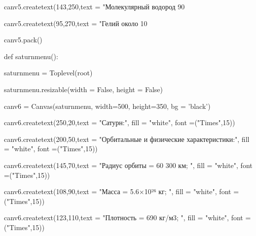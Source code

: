 \documentclass[14pt, oneside]{SavkinSeliverstov}
\begin{document}
	canv\underline{\hspace{0.2cm}}5.create\underline{\hspace{0.2cm}}text(143,250,text = "Молекулярный водород 90%

	canv\underline{\hspace{0.2cm}}5.create\underline{\hspace{0.2cm}}text(95,270,text = "Гелий около 10%
	
	canv\underline{\hspace{0.2cm}}5.pack()

def saturn\underline{\hspace{0.2cm}}menu():
	
	saturn\underline{\hspace{0.2cm}}menu = Toplevel(root)
	
	saturn\underline{\hspace{0.2cm}}menu.resizable(width = False, height = False)
	
	canv\underline{\hspace{0.2cm}}6 = Canvas(saturn\underline{\hspace{0.2cm}}menu, width=500, height=350, bg = 'black')
	
	canv\underline{\hspace{0.2cm}}6.create\underline{\hspace{0.2cm}}text(250,20,text = "Сатурн:", fill = "white", font =("Times",15))
	
	canv\underline{\hspace{0.2cm}}6.create\underline{\hspace{0.2cm}}text(200,50,text = "Орбитальные и физические характеристики:", fill = "white", font =("Times",15))

	canv\underline{\hspace{0.2cm}}6.create\underline{\hspace{0.2cm}}text(145,70,text = "Радиус орбиты =  60 300 км; ", fill = "white", font =("Times",15))

	canv\underline{\hspace{0.2cm}}6.create\underline{\hspace{0.2cm}}text(108,90,text = "Масса = 5.6×10²⁶ кг; ", fill = "white", font =("Times",15))

	canv\underline{\hspace{0.2cm}}6.create\underline{\hspace{0.2cm}}text(123,110,text = "Плотность = 690 кг/м3; ", fill = "white", font =("Times",15))
	
\end{document}
